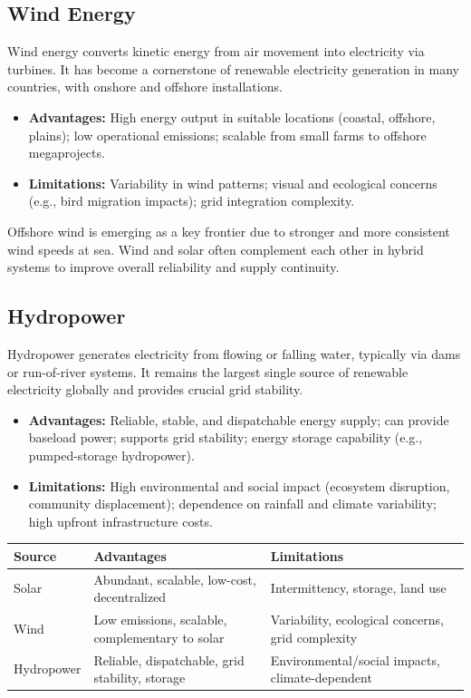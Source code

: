 \documentclass[12pt,a4paper]{article}
\begin{document}
\subsection{Wind Energy}

Wind energy converts kinetic energy from air movement into electricity via turbines. It has become a cornerstone of renewable electricity generation in many countries, with onshore and offshore installations.

\begin{itemize}
    \item \textbf{Advantages:} High energy output in suitable locations (coastal, offshore, plains); low operational emissions; scalable from small farms to offshore megaprojects.
    \item \textbf{Limitations:} Variability in wind patterns; visual and ecological concerns (e.g., bird migration impacts); grid integration complexity.
\end{itemize}

Offshore wind is emerging as a key frontier due to stronger and more consistent wind speeds at sea. Wind and solar often complement each other in hybrid systems to improve overall reliability and supply continuity.

\subsection{Hydropower}

Hydropower generates electricity from flowing or falling water, typically via dams or run-of-river systems. It remains the largest single source of renewable electricity globally and provides crucial grid stability.

\begin{itemize}
    \item \textbf{Advantages:} Reliable, stable, and dispatchable energy supply; can provide baseload power; supports grid stability; energy storage capability (e.g., pumped-storage hydropower).
    \item \textbf{Limitations:} High environmental and social impact (ecosystem disruption, community displacement); dependence on rainfall and climate variability; high upfront infrastructure costs.
\end{itemize}

\begin{center}
\renewcommand{\arraystretch}{1.4}
\begin{tabular}{|l|p{5.5cm}|p{6cm}|}
\hline
\textbf{Source} & \textbf{Advantages} & \textbf{Limitations} \\
\hline
Solar & Abundant, scalable, low-cost, decentralized & Intermittency, storage, land use \\
Wind & Low emissions, scalable, complementary to solar & Variability, ecological concerns, grid complexity \\
Hydropower & Reliable, dispatchable, grid stability, storage & Environmental/social impacts, climate-dependent \\
\hline
\end{tabular}
\end{center}
\end{document}
